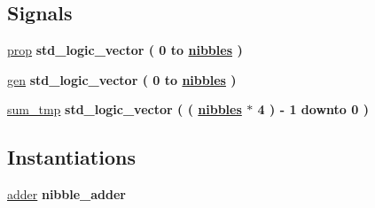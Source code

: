 \subsection*{Signals}
 \begin{DoxyCompactItemize}
\item 
\hyperlink{group___carry_loockahead_ga19afe0b89973d7fc29362431f2e828b7}{prop} {\bfseries \textcolor{vhdlchar}{std\+\_\+logic\+\_\+vector}\textcolor{vhdlchar}{ }\textcolor{vhdlchar}{(}\textcolor{vhdlchar}{ }\textcolor{vhdlchar}{ } \textcolor{vhdldigit}{0} \textcolor{vhdlchar}{ }\textcolor{vhdlchar}{to}\textcolor{vhdlchar}{ }\textcolor{vhdlchar}{ }\textcolor{vhdlchar}{ }\textcolor{vhdlchar}{ }{\bfseries \hyperlink{group___carry_loockahead_ga0b63b586531492d0fa882246cca071c1}{nibbles}} \textcolor{vhdlchar}{ }\textcolor{vhdlchar}{)}\textcolor{vhdlchar}{ }} 
\item 
\hyperlink{group___carry_loockahead_ga7a68948b7b96c7b51036939fad8e71b3}{gen} {\bfseries \textcolor{vhdlchar}{std\+\_\+logic\+\_\+vector}\textcolor{vhdlchar}{ }\textcolor{vhdlchar}{(}\textcolor{vhdlchar}{ }\textcolor{vhdlchar}{ } \textcolor{vhdldigit}{0} \textcolor{vhdlchar}{ }\textcolor{vhdlchar}{to}\textcolor{vhdlchar}{ }\textcolor{vhdlchar}{ }\textcolor{vhdlchar}{ }\textcolor{vhdlchar}{ }{\bfseries \hyperlink{group___carry_loockahead_ga0b63b586531492d0fa882246cca071c1}{nibbles}} \textcolor{vhdlchar}{ }\textcolor{vhdlchar}{)}\textcolor{vhdlchar}{ }} 
\item 
\hyperlink{group___carry_loockahead_ga6cccc2d4712341bbafb7f30f9e9c0f79}{sum\+\_\+tmp} {\bfseries \textcolor{vhdlchar}{std\+\_\+logic\+\_\+vector}\textcolor{vhdlchar}{ }\textcolor{vhdlchar}{(}\textcolor{vhdlchar}{ }\textcolor{vhdlchar}{(}\textcolor{vhdlchar}{ }\textcolor{vhdlchar}{ }\textcolor{vhdlchar}{ }\textcolor{vhdlchar}{ }{\bfseries \hyperlink{group___carry_loockahead_ga0b63b586531492d0fa882246cca071c1}{nibbles}} \textcolor{vhdlchar}{$\ast$}\textcolor{vhdlchar}{ } \textcolor{vhdldigit}{4} \textcolor{vhdlchar}{ }\textcolor{vhdlchar}{)}\textcolor{vhdlchar}{ }\textcolor{vhdlchar}{-\/}\textcolor{vhdlchar}{ } \textcolor{vhdldigit}{1} \textcolor{vhdlchar}{ }\textcolor{vhdlchar}{downto}\textcolor{vhdlchar}{ }\textcolor{vhdlchar}{ } \textcolor{vhdldigit}{0} \textcolor{vhdlchar}{ }\textcolor{vhdlchar}{)}\textcolor{vhdlchar}{ }} 
\end{DoxyCompactItemize}
\subsection*{Instantiations}
 \begin{DoxyCompactItemize}
\item 
\hyperlink{classgeneric__cla__adder_1_1structural_a9d7a8a381439c61aea549e7a47ec7a6f}{adder}  {\bfseries nibble\+\_\+adder}   
\end{DoxyCompactItemize}


